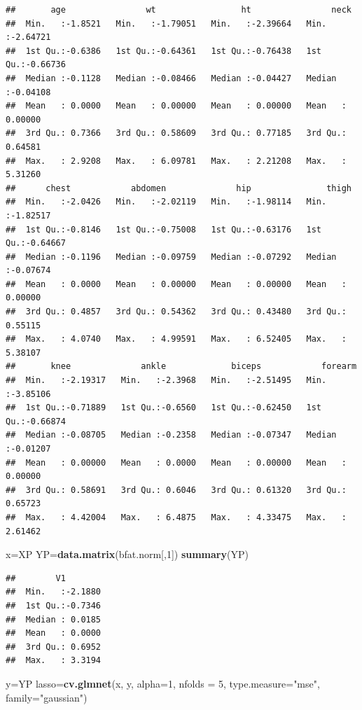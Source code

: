 \documentclass[]{article}
\newenvironment{Shaded}{\begin{snugshade}}{\end{snugshade}}
\newcommand{\KeywordTok}[1]{\textcolor[rgb]{0.13,0.29,0.53}{\textbf{#1}}}
\newcommand{\DataTypeTok}[1]{\textcolor[rgb]{0.13,0.29,0.53}{#1}}
\newcommand{\DecValTok}[1]{\textcolor[rgb]{0.00,0.00,0.81}{#1}}
\newcommand{\StringTok}[1]{\textcolor[rgb]{0.31,0.60,0.02}{#1}}
\newcommand{\NormalTok}[1]{#1}
\begin{document}
\begin{verbatim}
##       age                wt                 ht                neck         
##  Min.   :-1.8521   Min.   :-1.79051   Min.   :-2.39664   Min.   :-2.64721  
##  1st Qu.:-0.6386   1st Qu.:-0.64361   1st Qu.:-0.76438   1st Qu.:-0.66736  
##  Median :-0.1128   Median :-0.08466   Median :-0.04427   Median :-0.04108  
##  Mean   : 0.0000   Mean   : 0.00000   Mean   : 0.00000   Mean   : 0.00000  
##  3rd Qu.: 0.7366   3rd Qu.: 0.58609   3rd Qu.: 0.77185   3rd Qu.: 0.64581  
##  Max.   : 2.9208   Max.   : 6.09781   Max.   : 2.21208   Max.   : 5.31260  
##      chest            abdomen              hip               thigh         
##  Min.   :-2.0426   Min.   :-2.02119   Min.   :-1.98114   Min.   :-1.82517  
##  1st Qu.:-0.8146   1st Qu.:-0.75008   1st Qu.:-0.63176   1st Qu.:-0.64667  
##  Median :-0.1196   Median :-0.09759   Median :-0.07292   Median :-0.07674  
##  Mean   : 0.0000   Mean   : 0.00000   Mean   : 0.00000   Mean   : 0.00000  
##  3rd Qu.: 0.4857   3rd Qu.: 0.54362   3rd Qu.: 0.43480   3rd Qu.: 0.55115  
##  Max.   : 4.0740   Max.   : 4.99591   Max.   : 6.52405   Max.   : 5.38107  
##       knee              ankle             biceps            forearm        
##  Min.   :-2.19317   Min.   :-2.3968   Min.   :-2.51495   Min.   :-3.85106  
##  1st Qu.:-0.71889   1st Qu.:-0.6560   1st Qu.:-0.62450   1st Qu.:-0.66874  
##  Median :-0.08705   Median :-0.2358   Median :-0.07347   Median :-0.01207  
##  Mean   : 0.00000   Mean   : 0.0000   Mean   : 0.00000   Mean   : 0.00000  
##  3rd Qu.: 0.58691   3rd Qu.: 0.6046   3rd Qu.: 0.61320   3rd Qu.: 0.65723  
##  Max.   : 4.42004   Max.   : 6.4875   Max.   : 4.33475   Max.   : 2.61462
\end{verbatim}

\begin{Shaded}
\begin{Highlighting}[]
\NormalTok{x=XP}
\NormalTok{YP=}\KeywordTok{data.matrix}\NormalTok{(bfat.norm[,}\DecValTok{1}\NormalTok{])}
\KeywordTok{summary}\NormalTok{(YP)}
\end{Highlighting}
\end{Shaded}

\begin{verbatim}
##        V1         
##  Min.   :-2.1880  
##  1st Qu.:-0.7346  
##  Median : 0.0185  
##  Mean   : 0.0000  
##  3rd Qu.: 0.6952  
##  Max.   : 3.3194
\end{verbatim}

\begin{Shaded}
\begin{Highlighting}[]
\NormalTok{y=YP}
\NormalTok{lasso=}\KeywordTok{cv.glmnet}\NormalTok{(x, }
\NormalTok{                y, }\DataTypeTok{alpha=}\DecValTok{1}\NormalTok{,}
                \DataTypeTok{nfolds =} \DecValTok{5}\NormalTok{, }\DataTypeTok{type.measure=}\StringTok{"mse"}\NormalTok{, }
                \DataTypeTok{family=}\StringTok{"gaussian"}\NormalTok{)}
\end{Highlighting}
\end{Shaded}
\end{document}

